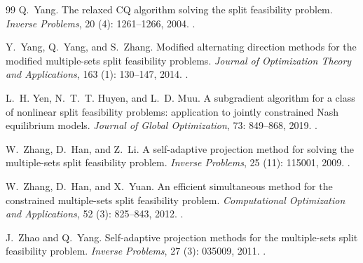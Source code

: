 \documentclass[]{interact}
\theoremstyle{plain}
\theoremstyle{definition}
\theoremstyle{remark}
\begin{document}
\begin{thebibliography}{99}
Q.~Yang.
\newblock The relaxed {CQ} algorithm solving the split feasibility problem.
\newblock \emph{Inverse Problems}, 20 (4): 1261--1266, 2004.
\newblock {}.

Y.~Yang, Q.~Yang, and S.~Zhang.
\newblock Modified alternating direction methods for the modified multiple-sets split feasibility problems.
\newblock \emph{Journal of Optimization Theory and Applications}, 163 (1): 130--147, 2014.
\newblock {}.

L.~H. Yen, N.~T.~T. Huyen, and L.~D. Muu.
\newblock A subgradient algorithm for a class of nonlinear split feasibility problems: application to jointly constrained Nash equilibrium models.
\newblock \emph{Journal of Global Optimization}, 73: 849--868, 2019.
\newblock {}.

W.~Zhang, D.~Han, and Z.~Li.
\newblock A self-adaptive projection method for solving the multiple-sets split feasibility problem.
\newblock \emph{Inverse Problems}, 25 (11): 115001, 2009.
\newblock {}.

W.~Zhang, D.~Han, and X.~Yuan.
\newblock An efficient simultaneous method for the constrained multiple-sets split feasibility problem.
\newblock \emph{Computational Optimization and Applications}, 52 (3): 825--843, 2012.
\newblock {}.

J.~Zhao and Q.~Yang.
\newblock Self-adaptive projection methods for the multiple-sets split feasibility problem.
\newblock \emph{Inverse Problems}, 27 (3): 035009, 2011.
\newblock {}.

\end{thebibliography}
\end{document}
